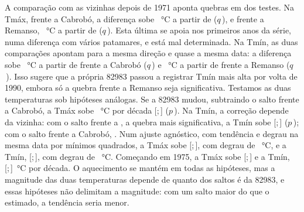 \documentclass[11pt,a4paper]{article}
\newcommand{\IC}[2]{[#1;\,#2]}            %
\newcommand{\Est}{82983}
\begin{document}
A comparação com as vizinhas depois de 1971 aponta quebras em \NquebrasTemp{} dos \NtestesTemp{} testes.
Na Tmáx, frente a Cabrobó, a diferença sobe \SaltoTmaxCabrobo{}~°C a partir de \QuebraTmaxCabrobo{}
($q$\,\QQuebraTmaxCabrobo), e frente a Remanso, \SaltoTmaxRemanso{}~°C a partir de \QuebraTmaxRemanso{}
($q$\,\QQuebraTmaxRemanso). Esta última se apoia nos primeiros anos da série, numa diferença com vários
patamares, e está mal determinada. Na Tmín, as duas comparações apontam para a mesma direção e quase a
mesma data: a diferença sobe \SaltoTminCabrobo{}~°C a partir de \QuebraTminCabrobo{} frente a Cabrobó
($q$\,\QQuebraTminCabrobo) e \SaltoTminRemanso{}~°C a partir de \QuebraTminRemanso{} frente a Remanso
($q$\,\QQuebraTminRemanso). Isso sugere que a própria \Est{} passou a registrar Tmín mais alta por volta
de 1990, embora só a quebra frente a Remanso seja significativa. Testamos as duas temperaturas sob
hipóteses análogas. Se a \Est{} mudou, subtraindo o salto frente a Cabrobó, a Tmáx sobe
\SenTmaxAjustada{}~°C por década \IC{\SenTmaxAjustadaICinf}{\SenTmaxAjustadaICsup}
($p$\,\PTFPWTmaxAjustada). Na Tmín, a correção depende da vizinha: com o salto frente a \VizTminAjuste{},
a quebra mais significativa, a Tmín sobe \SenTminAjustada{} \IC{\SenTminAjustadaICinf}{\SenTminAjustadaICsup}
($p$\,\PTFPWTminAjustada); com o salto frente a Cabrobó, \SenTminAjustadaCabrobo{}. Num ajuste agnóstico, com
tendência e degrau na mesma data por mínimos quadrados, a Tmáx sobe \BTmaxDegrau{}
\IC{\BTmaxDegrauICinf}{\BTmaxDegrauICsup}, com degrau de \DegrauTmax{}~°C, e a Tmín, \BTminDegrau{}
\IC{\BTminDegrauICinf}{\BTminDegrauICsup}, com degrau de \DegrauTmin{}~°C. Começando em 1975, a Tmáx sobe
\SenTmaxDesdeSetentaCinco{} \IC{\SenTmaxDesdeSetentaCincoICinf}{\SenTmaxDesdeSetentaCincoICsup} e a Tmín,
\SenTminDesdeSetentaCinco{} \IC{\SenTminDesdeSetentaCincoICinf}{\SenTminDesdeSetentaCincoICsup}~°C por
década. O aquecimento se mantém em todas as hipóteses, mas a magnitude das duas temperaturas depende
de quanto dos saltos é da \Est{}, e essas hipóteses não delimitam a magnitude: com um salto maior do que o
estimado, a tendência seria menor.
\end{document}
